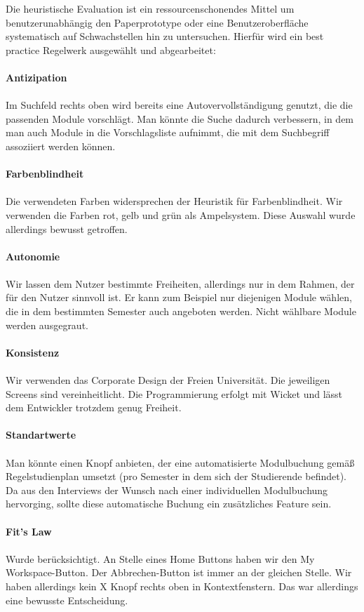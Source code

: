 \documentclass{article}
\begin{document}
Die heuristische Evaluation ist ein ressourcenschonendes Mittel um benutzerunabhängig den Paperprototype oder eine Benutzeroberfläche systematisch auf Schwachstellen hin zu untersuchen. Hierfür wird ein best practice Regelwerk ausgewählt und abgearbeitet:\\
\\
\textbf{Antizipation}\\
\\
Im Suchfeld rechts oben wird bereits eine Autovervollständigung genutzt, die die passenden Module vorschlägt. Man könnte die Suche dadurch verbessern, in dem man auch Module in die Vorschlagsliste aufnimmt, die mit dem Suchbegriff assoziiert werden können.\\
\\
\textbf{Farbenblindheit}\\
\\
Die verwendeten Farben widersprechen der Heuristik für Farbenblindheit. Wir verwenden die Farben rot, gelb und grün als Ampelsystem. Diese Auswahl wurde allerdings bewusst getroffen.\\
\\
\textbf{Autonomie}\\
\\
Wir lassen dem Nutzer bestimmte Freiheiten, allerdings nur in dem Rahmen, der für den Nutzer sinnvoll ist. Er kann zum Beispiel nur diejenigen Module wählen, die in dem bestimmten Semester auch angeboten werden. Nicht wählbare Module werden ausgegraut.\\
\\
\textbf{Konsistenz}\\
\\
Wir verwenden das Corporate Design der Freien Universität. Die jeweiligen Screens sind vereinheitlicht. Die Programmierung erfolgt mit Wicket und lässt dem Entwickler trotzdem genug Freiheit.\\
\\
\textbf{Standartwerte}\\
\\
Man könnte einen Knopf anbieten, der eine automatisierte Modulbuchung gemäß Regelstudienplan umsetzt (pro Semester in dem sich der Studierende befindet). Da aus den Interviews der Wunsch nach einer individuellen Modulbuchung hervorging, sollte diese automatische Buchung ein zusätzliches Feature sein.\\
\\
\textbf{Fit's Law}\\
\\
Wurde berücksichtigt. An Stelle eines Home Buttons haben wir den My Workspace-Button. Der Abbrechen-Button ist immer an der gleichen Stelle. Wir haben allerdings kein X Knopf rechts oben in Kontextfenstern. Das war allerdings eine bewusste Entscheidung.\\
\end{document}
